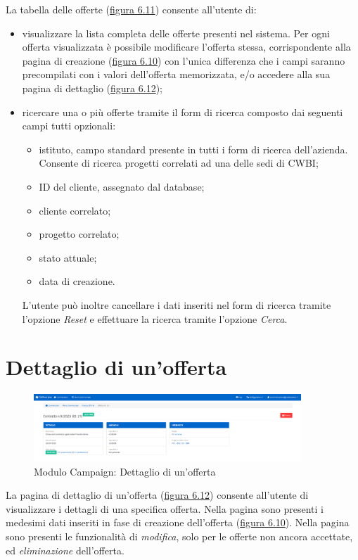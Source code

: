 \noindent La tabella delle offerte ({\hyperref[fig:tabellaOfferte]{figura 6.11}}) consente all'utente di:
\begin{itemize}
\item visualizzare la lista completa delle offerte presenti nel sistema. Per ogni offerta visualizzata è possibile modificare l'offerta stessa, corrispondente alla pagina di creazione ({\hyperref[fig:nuovaOfferta]{figura 6.10}}) con l'unica differenza che i campi saranno precompilati con i valori dell'offerta memorizzata, e/o accedere alla sua pagina di dettaglio ({\hyperref[fig:dettaglioOfferta]{figura 6.12}}); 
\item ricercare una o più offerte tramite il form di ricerca composto dai seguenti campi tutti opzionali:
\begin{itemize}
\item istituto, campo standard presente in tutti i form di ricerca dell'azienda. Consente di ricerca progetti correlati ad una delle sedi di CWBI;
\item ID del cliente, assegnato dal database;
\item cliente correlato;
\item progetto correlato;
\item stato attuale;
\item data di creazione.
\end{itemize}
L'utente può inoltre cancellare i dati inseriti nel form di ricerca tramite l'opzione \textit{Reset} e effettuare la ricerca tramite l'opzione \textit{Cerca}.
\end{itemize}

\pagebreak

\section{Dettaglio di un'offerta}
\begin{figure}[!h]
\centering
\includegraphics[width=380px]{../images/UI/12-dettaglioOfferta.png}
\caption{Modulo Campaign: Dettaglio di un'offerta}
\label{fig:dettaglioOfferta}
\end{figure}

\noindent La pagina di dettaglio di un'offerta ({\hyperref[fig:dettaglioOfferta]{figura 6.12}}) consente all'utente di visualizzare i dettagli di una specifica offerta. Nella pagina sono presenti i medesimi dati inseriti in fase di creazione dell'offerta ({\hyperref[fig:nuovaOfferta]{figura 6.10}}). Nella pagina sono presenti le funzionalità di \textit{modifica}, solo per le offerte non ancora accettate, ed \textit{eliminazione} dell'offerta.